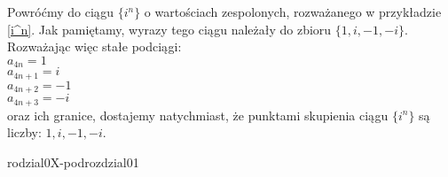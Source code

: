 \begin{przyklad}
Powróćmy do ciągu $\{i^n\}$ o wartościach zespolonych, rozważanego w przykładzie \ref{i^n}. Jak pamiętamy, wyrazy tego ciągu należały do zbioru $\{1, i, -1, -i \}$. Rozważając więc stałe podciągi:\\
$a_{4n}=1$\\
$a_{4n+1}=i$\\
$a_{4n+2}=-1$\\
$a_{4n+3}=-i$\\
oraz ich granice, dostajemy natychmiast, że punktami skupienia ciągu $\{i^n\}$ są liczby: $1, i, -1, -i$.
\end{przyklad}

rodzial0X-podrozdzial01
